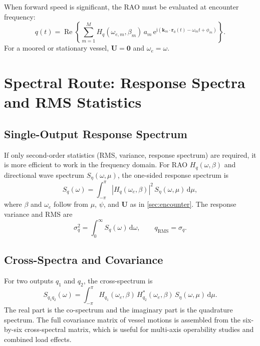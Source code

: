 \documentclass[journal,10pt,twocolumn]{IEEEtran}
\newcommand{\dd}{\,\mathrm{d}}
\newcommand{\ii}{\mathrm{i}}
\newcommand{\ee}{\mathrm{e}}
\newcommand{\Real}{\operatorname{Re}}
\newcommand{\vect}[1]{\bm{#1}}
\begin{document}
    When forward speed is significant, the RAO must be evaluated at encounter frequency:
    \begin{equation}
        q(t)
        = \Real\!\left\{
        \sum_{m=1}^{M}
        H_q(\omega_{e,m},\beta_m)\,a_m\,
        \ee^{\ii(\vect{k}_m\cdot\vect{r}_0(t) - \omega_m t + \phi_m)}
        \right\}.
        \label{eq:response_encounter}
    \end{equation}
    For a moored or stationary vessel, $\vect{U}=\vect{0}$ and $\omega_e=\omega$.

    \section{Spectral Route: Response Spectra and RMS Statistics}
    \label{sec:spectral}

    \subsection{Single-Output Response Spectrum}
    \label{sec:responsespec}

    If only second-order statistics (RMS, variance, response spectrum) are required, it is
    more efficient to work in the frequency domain.
    For RAO $H_q(\omega,\beta)$ and directional wave spectrum $S_\eta(\omega,\mu)$, the
    one-sided response spectrum is
    \begin{equation}
        S_q(\omega)
        = \int_{-\pi}^{\pi}
        |H_q(\omega_e,\beta)|^2\,S_\eta(\omega,\mu)\dd\mu,
        \label{eq:response_spectrum}
    \end{equation}
    where $\beta$ and $\omega_e$ follow from $\mu$, $\psi$, and $\vect{U}$ as in
    \cref{sec:encounter}.
    The response variance and RMS are
    \begin{equation}
        \sigma_q^2 = \int_0^\infty S_q(\omega)\dd\omega,
        \qquad
        q_{\mathrm{RMS}} = \sigma_q.
        \label{eq:rms}
    \end{equation}

    \subsection{Cross-Spectra and Covariance}
    \label{sec:crossspec}

    For two outputs $q_1$ and $q_2$, the cross-spectrum is
    \begin{equation}
        S_{q_1q_2}(\omega)
        = \int_{-\pi}^{\pi}
        H_{q_1}(\omega_e,\beta)\,
        H_{q_2}^{*}(\omega_e,\beta)\,
        S_\eta(\omega,\mu)\dd\mu.
        \label{eq:crossspectrum}
    \end{equation}
    The real part is the co-spectrum and the imaginary part is the quadrature spectrum.
    The full covariance matrix of vessel motions is assembled from the six-by-six
    cross-spectral matrix, which is useful for multi-axis operability studies and combined
    load effects.
\end{document}
